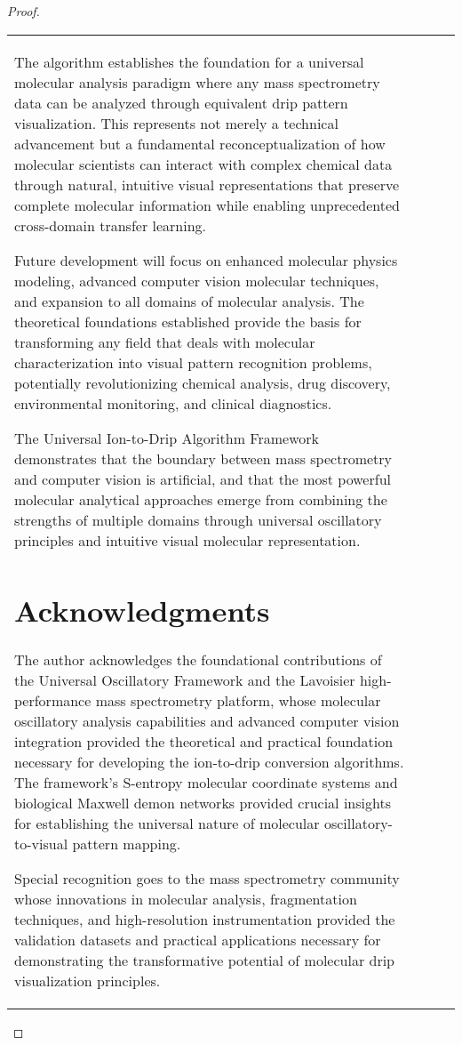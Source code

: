 \documentclass[12pt,a4paper]{article}
\begin{document}
\begin{table}[H]
\begin{proof}
\begin{table}[H]
\begin{table}[H]
\begin{tabular}{lccc}
{{\begin{enumerate}
\begin{enumerate}
\begin{enumerate}
The algorithm establishes the foundation for a universal molecular analysis paradigm where any mass spectrometry data can be analyzed through equivalent drip pattern visualization. This represents not merely a technical advancement but a fundamental reconceptualization of how molecular scientists can interact with complex chemical data through natural, intuitive visual representations that preserve complete molecular information while enabling unprecedented cross-domain transfer learning.

Future development will focus on enhanced molecular physics modeling, advanced computer vision molecular techniques, and expansion to all domains of molecular analysis. The theoretical foundations established provide the basis for transforming any field that deals with molecular characterization into visual pattern recognition problems, potentially revolutionizing chemical analysis, drug discovery, environmental monitoring, and clinical diagnostics.

The Universal Ion-to-Drip Algorithm Framework demonstrates that the boundary between mass spectrometry and computer vision is artificial, and that the most powerful molecular analytical approaches emerge from combining the strengths of multiple domains through universal oscillatory principles and intuitive visual molecular representation.

\section{Acknowledgments}

The author acknowledges the foundational contributions of the Universal Oscillatory Framework and the Lavoisier high-performance mass spectrometry platform, whose molecular oscillatory analysis capabilities and advanced computer vision integration provided the theoretical and practical foundation necessary for developing the ion-to-drip conversion algorithms. The framework's S-entropy molecular coordinate systems and biological Maxwell demon networks provided crucial insights for establishing the universal nature of molecular oscillatory-to-visual pattern mapping.

Special recognition goes to the mass spectrometry community whose innovations in molecular analysis, fragmentation techniques, and high-resolution instrumentation provided the validation datasets and practical applications necessary for demonstrating the transformative potential of molecular drip visualization principles.


\end{enumerate}
\end{enumerate}
\end{enumerate}}}
\end{tabular}
\end{table}
\end{table}
\end{proof}
\end{table}
\end{document}
